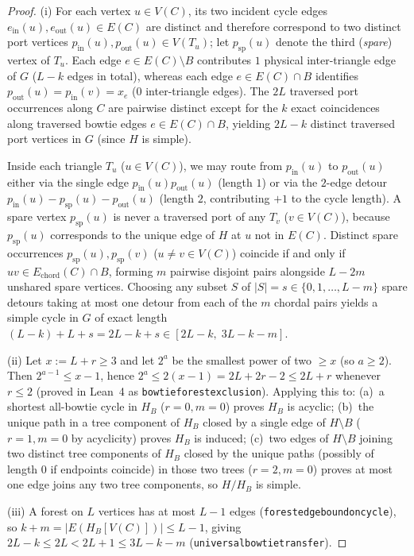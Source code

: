 \documentclass[11pt,reqno]{amsart}
\theoremstyle{plain}
\theoremstyle{definition}
\theoremstyle{remark}
\DeclareRobustCommand{\_}{\ifmmode\text{\textunderscore}\else\textunderscore\allowbreak\fi}
\begin{document}
\begin{proof}
(i) For each vertex $u \in V(C)$, its two incident cycle edges $e_{\mathrm{in}}(u), e_{\mathrm{out}}(u) \in E(C)$ are distinct and therefore correspond to two distinct port vertices $p_{\mathrm{in}}(u), p_{\mathrm{out}}(u) \in V(T_u)$; let $p_{\mathrm{sp}}(u)$ denote the third (\emph{spare}) vertex of $T_u$. Each edge $e \in E(C) \setminus B$ contributes $1$ physical inter-triangle edge of $G$ ($L - k$ edges in total), whereas each edge $e \in E(C) \cap B$ identifies $p_{\mathrm{out}}(u) = p_{\mathrm{in}}(v) = x_e$ ($0$ inter-triangle edges). The $2L$ traversed port occurrences along $C$ are pairwise distinct except for the $k$ exact coincidences along traversed bowtie edges $e \in E(C) \cap B$, yielding $2L - k$ distinct traversed port vertices in $G$ (since $H$ is simple).

Inside each triangle $T_u$ ($u \in V(C)$), we may route from $p_{\mathrm{in}}(u)$ to $p_{\mathrm{out}}(u)$ either via the single edge $p_{\mathrm{in}}(u) p_{\mathrm{out}}(u)$ (length $1$) or via the $2$-edge detour $p_{\mathrm{in}}(u) - p_{\mathrm{sp}}(u) - p_{\mathrm{out}}(u)$ (length $2$, contributing $+1$ to the cycle length). A spare vertex $p_{\mathrm{sp}}(u)$ is never a traversed port of any $T_v$ ($v \in V(C)$), because $p_{\mathrm{sp}}(u)$ corresponds to the unique edge of $H$ at $u$ not in $E(C)$. Distinct spare occurrences $p_{\mathrm{sp}}(u), p_{\mathrm{sp}}(v)$ ($u \neq v \in V(C)$) coincide if and only if $uv \in E_{\mathrm{chord}}(C) \cap B$, forming $m$ pairwise disjoint pairs alongside $L - 2m$ unshared spare vertices. Choosing any subset $S$ of $|S| = s \in \{0, 1, \dots, L - m\}$ spare detours taking at most one detour from each of the $m$ chordal pairs yields a simple cycle in $G$ of exact length $(L - k) + L + s = 2L - k + s \in [2L - k,\; 3L - k - m]$.

(ii) Let $x := L + r \ge 3$ and let $2^a$ be the smallest power of two $\ge x$ (so $a \ge 2$). Then $2^{a-1} \le x - 1$, hence $2^a \le 2(x - 1) = 2L + 2r - 2 \le 2L + r$ whenever $r \le 2$ (proved in Lean~4 as \texttt{bowtie\_forest\_exclusion}). Applying this to: (a)~a shortest all-bowtie cycle in $H_B$ ($r = 0, m = 0$) proves $H_B$ is acyclic; (b)~the unique path in a tree component of $H_B$ closed by a single edge of $H \setminus B$ ($r = 1, m = 0$ by acyclicity) proves $H_B$ is induced; (c)~two edges of $H \setminus B$ joining two distinct tree components of $H_B$ closed by the unique paths (possibly of length $0$ if endpoints coincide) in those two trees ($r = 2, m = 0$) proves at most one edge joins any two tree components, so $H/H_B$ is simple.

(iii) A forest on $L$ vertices has at most $L - 1$ edges (\texttt{forest\_edge\_bound\_on\_cycle}), so $k + m = |E(H_B[V(C)])| \le L - 1$, giving $2L - k \le 2L < 2L + 1 \le 3L - k - m$ (\texttt{universal\_bowtie\_transfer}).
\end{proof}
\end{document}
